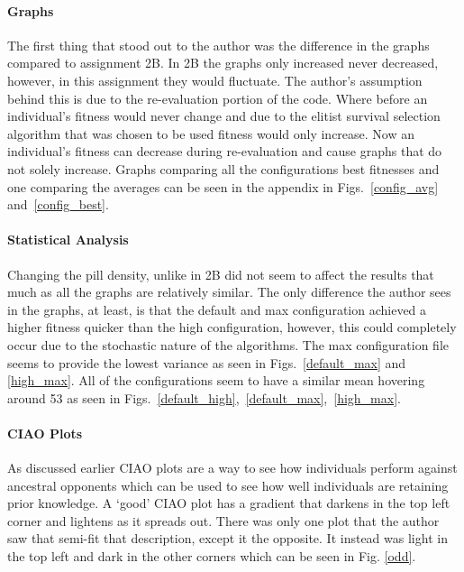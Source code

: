 \paragraph{Graphs}

The first thing that stood out to the author was the difference in the graphs compared to assignment 2B.
In 2B the graphs only increased never decreased, however, in this assignment they would fluctuate.
The author's assumption behind this is due to the re-evaluation portion of the code.
Where before an individual's fitness would never change and due to the elitist survival selection algorithm that was chosen to be used fitness would only increase.
Now an individual's fitness can decrease during re-evaluation and cause graphs that do not solely increase.
Graphs comparing all the configurations best fitnesses and one comparing the averages can be seen in the appendix in Figs.~\ref{config_avg} and~\ref{config_best}.

\paragraph{Statistical Analysis}

Changing the pill density, unlike in 2B did not seem to affect the results that much as all the graphs are relatively similar.
The only difference the author sees in the graphs, at least, is that the default and max configuration achieved a higher fitness quicker than the high configuration, however, this could completely occur due to the stochastic nature of the algorithms. 
The max configuration file seems to provide the lowest variance as seen in Figs.~\ref{default_max} and \ref{high_max}.
All of the configurations seem to have a similar mean hovering around 53 as seen in Figs.~\ref{default_high},~\ref{default_max},~\ref{high_max}.

\paragraph{CIAO Plots}

As discussed earlier CIAO plots are a way to see how individuals perform against ancestral opponents which can be used to see how well individuals are retaining prior knowledge. 
A `good' CIAO plot has a gradient that darkens in the top left corner and lightens as it spreads out.
There was only one plot that the author saw that semi-fit that description, except it the opposite.
It instead was light in the top left and dark in the other corners which can be seen in Fig. \ref{odd}.

